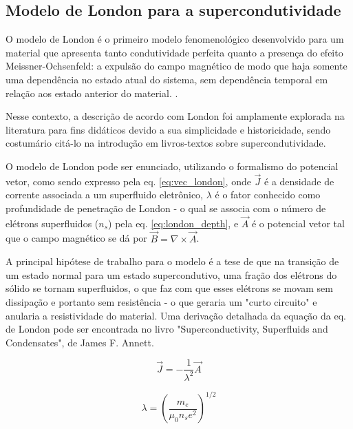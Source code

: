 \documentclass[%
 reprint,
 amsmath,amssymb,
 aps,
]{revtex4-1}
\begin{document}
\subsection{Modelo de London para a supercondutividade}


O modelo de London é o primeiro modelo fenomenológico desenvolvido para um material que apresenta tanto condutividade perfeita quanto a presença do efeito Meissner-Ochsenfeld: a expulsão do campo magnético de modo que haja somente uma dependência no estado atual do sistema, sem dependência temporal em relação aos estado anterior do material. \cite{annett}.

Nesse contexto, a descrição de acordo com London foi amplamente explorada na literatura para fins didáticos devido a sua simplicidade e historicidade, sendo costumário citá-lo na introdução em livros-textos sobre supercondutividade. \cite{original_article}

O modelo de London pode ser enunciado, utilizando o formalismo do potencial vetor, como sendo expresso pela eq.  \ref{eq:vec_london}, onde $\vec{J}$ é a densidade de corrente associada a um superfluido eletrônico, $\lambda$ é o fator conhecido como profundidade de penetração de London - o qual se associa com o número de elétrons superfluidos ($n_s$) pela eq. \ref{eq:london_depth}, e $\vec{A}$ é o potencial vetor tal que o campo magnético se dá por $\vec{B} = \nabla \times \vec{A}$.  \cite{original_article} \cite{annett}

A principal hipótese de trabalho para o modelo é a tese de que na transição de um estado normal para um estado supercondutivo, uma fração dos elétrons do sólido se tornam superfluidos, o que faz com que esses elétrons se movam sem dissipação e portanto sem resistência - o que geraria um "curto circuito" e anularia a resistividade do material. Uma derivação detalhada da equação da eq. de London pode ser encontrada no livro "Superconductivity, Superfluids and Condensates", de James F. Annett. \cite{annett}

\begin{equation}
    \label{eq:vec_london}
    \vec{J}=-\frac{1}{\lambda^2}   \vec{A}
\end{equation}

\begin{equation}
    \label{eq:london_depth}
    \lambda = (\frac{m_e}{\mu_0 n_s e^2})^{1/2}
\end{equation}

\end{document}
